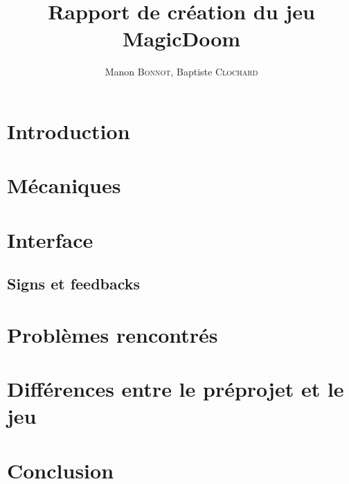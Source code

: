 


\author{Manon \textsc{Bonnot}, Baptiste \textsc{Clochard}}
\title{Rapport de création du jeu MagicDoom}
%




\tableofcontents
\newpage

\section{Introduction}
    
    

\section{Mécaniques}
    

\section{Interface}
  \subsection{Signs et feedbacks}

\section{Problèmes rencontrés}

\section{Différences entre le préprojet et le jeu}

\section{Conclusion}

\pagebreak


